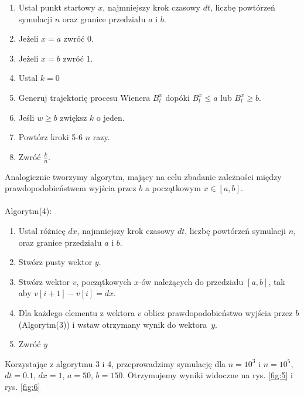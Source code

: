 \documentclass{article}
\theoremstyle{break}
\begin{document}
\begin{enumerate}
	\item Ustal punkt startowy $x$, najmniejszy krok czasowy $dt$, liczbę powtórzeń symulacji $n$  oraz granice przedziału $a$ i $b$.
	\item Jeżeli $x=a$ zwróć 0.
	\item Jeżeli $x=b$ zwróć 1.
	\item Ustal $k=0$ 
	\item Generuj trajektorię procesu Wienera $B_t^x$ dopóki $B_t^x\leq a$ lub $B_t^x\geq b$.
	\item Jeśli $w\geq b$ zwiększ $k$ o jeden.
	\item Powtórz kroki 5-6 $n$ razy.
	\item Zwróć $\frac{k}{n}$.
\end{enumerate}
Analogicznie tworzymy algorytm, mający na celu zbadanie zależności między prawdopodobieństwem wyjścia przez $b$ a początkowym $x\in [a,b]$.\\ \\ 
Algorytm(4):
\begin{enumerate}
	\item Ustal różnicę $dx$, najmniejszy krok czasowy $dt$, liczbę powtórzeń symulacji $n$, oraz granice przedziału $a$ i $b$.
	\item Stwórz pusty wektor $y$.
	\item Stwórz wektor $v$, początkowych $x$-ów należących do przedziału $[a,b]$, tak aby $v[i+1]-v[i]=dx$.
	\item Dla każdego elementu z wektora $v$ oblicz prawdopodobieństwo wyjścia przez $b$ (Algorytm(3)) i wstaw otrzymany wynik do wektora~$y$.
	\item Zwróć $y$
\end{enumerate}
Korzystając z algorytmu 3 i 4, przeprowadzimy symulację dla $n=10^3$ i $n=10^5$, $dt=0.1$, $dx=1$, $a=50$, $b=150$. Otrzymujemy wyniki widoczne na rys. \ref{fig:5} i rys. \ref{fig:6}
\end{document}
